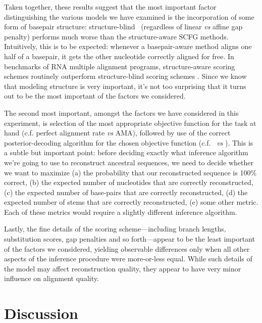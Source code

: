 \documentclass[10pt]{article}
\begin{document}
Taken together, these results suggest that the most important factor distinguishing the various models we have examined
is the incorporation of some form of basepair structure:
structure-blind \handel\  (regardless of linear {\em vs} affine gap penalty) performs much worse than the structure-aware SCFG methods.
Intuitively, this is to be expected: whenever a basepair-aware method aligns one half of a basepair, it gets the other nucleotide
correctly aligned for free.
In benchmarks of RNA multiple alignment programs, structure-aware scoring schemes routinely outperform structure-blind scoring schemes \cite{GardnerEtAl2005,WilmEtAl2006}.
Since we know that modeling structure is very important, it's not too surprising that it turns out to be the most important of the factors we considered.

The second most important, amongst the factors we have considered in this experiment, is
selection of the most appropriate objective function for the task at hand
(c.f. perfect alignment rate {\em vs} AMA),
followed by use of the correct posterior-decoding algorithm for the chosen objective function
(c.f. \stemloc\ {\em vs} \stemlocama).
This is a subtle but important point: before deciding exactly what inference algorithm we're going to use to reconstruct ancestral sequences,
we need to decide whether we want to maximize
(a) the probability that our reconstructed sequence is 100\% correct,
(b) the expected number of nucleotides that are correctly reconstructed,
(c) the expected number of base-pairs that are correctly reconstructed,
(d) the expected number of stems that are correctly reconstructed,
(e) some other metric.
Each of these metrics would require a slightly different inference algorithm.

Lastly, the fine details of the scoring scheme---including branch lengths, substitution scores, gap penalties and so forth---appear to
be the least important of the factors we considered, yielding observable differences only when all other aspects of the inference procedure were more-or-less equal.
While such details of the model may affect reconstruction quality,
they appear to have very minor influence on alignment quality.


\section*{Discussion}
\end{document}
